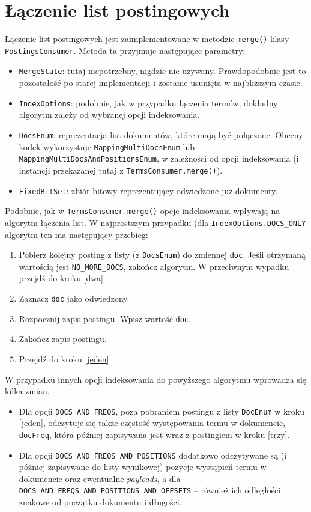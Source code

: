 \section{Łączenie list postingowych}

Łączenie list postingowych jest zaimplementowane w metodzie \texttt{merge()} klasy \texttt{PostingsConsumer}. Metoda ta przyjmuje następujące parametry:
\begin{itemize}
 \item \texttt{MergeState}: tutaj niepotrzebny, nigdzie nie używany. Prawdopodobnie jest to pozostałość po starej implementacji i zostanie usunięta w najbliższym czasie.
 \item \texttt{IndexOptions}: podobnie, jak w przypadku łączenia termów, dokładny algorytm zależy od wybranej opcji indeksowania.
 \item \texttt{DocsEnum}: reprezentacja list dokumentów, które mają być połączone. Obecny kodek wykorzystuje \texttt{MappingMultiDocsEnum} lub \texttt{MappingMultiDocsAndPositionsEnum}, w zależności od opcji indeksowania (i instancji przekazanej tutaj z \texttt{TermsConsumer.merge()}). 
 \item \texttt{FixedBitSet}: zbiór bitowy reprezentujący odwiedzone już dokumenty.
\end{itemize}

Podobnie, jak w \texttt{TermsConsumer.merge()} opcje indeksowania wpływają na algorytm łączenia list. W najprostszym przypadku (dla \texttt{IndexOptions.DOCS\_ONLY} algorytm ten ma następujący przebieg:
\begin{enumerate}
 \item \label{jeden} Pobierz kolejny posting z listy (z \texttt{DocsEnum}) do zmiennej \texttt{doc}. Jeśli otrzymaną wartością jest \texttt{NO\_MORE\_DOCS}, zakończ algorytm. W przeciwnym wypadku przejdź do kroku \ref{dwa}
 \item \label{dwa} Zaznacz \texttt{doc} jako odwiedzony.
 \item \label{trzy} Rozpocznij zapis postingu. Wpisz wartość \texttt{doc}.
 \item Zakończ zapis postingu.
 \item Przejdź do kroku \ref{jeden}.
\end{enumerate}

W przypadku innych opcji indeksowania do powyższego algorytmu wprowadza się kilka zmian.
\begin{itemize}
 \item Dla opcji \texttt{DOCS\_AND\_FREQS}, poza pobraniem postingu z listy \texttt{DocEnum} w kroku \ref{jeden}, odczytuje się także częstość występowania termu w dokumencie, \texttt{docFreq}, która później zapisywana jest wraz z postingiem w kroku \ref{trzy}.
 \item Dla opcji \texttt{DOCS\_AND\_FREQS\_AND\_POSITIONS} dodatkowo odczytywane są (i później zapisywane do listy wynikowej) pozycje wystąpień termu w dokumencie oraz ewentualne \emph{payloads}, a dla \texttt{DOCS\_AND\_FREQS\_AND\_POSITIONS\_AND\_OFFSETS} -- również ich odległości znakowe od początku dokumentu i długości.
\end{itemize}
